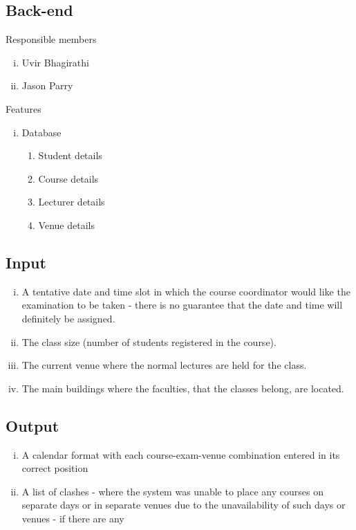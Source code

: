 \documentclass{article}
\begin{document}
\subsection{Back-end}

Responsible members
\begin{enumerate}[i., nosep]
	\item Uvir Bhagirathi
	\item Jason Parry
\end{enumerate}

Features
\begin{enumerate}[i., nosep]

	\item Database
		\begin{enumerate}[-, nosep]
			\item Student details
			\item Course details
			\item Lecturer details
			\item Venue details
		\end{enumerate}
	
\end{enumerate}

\subsection{Input}

\begin{enumerate}[i., leftmargin=*]
	\item A tentative  date  and  time  slot  in  which  the course coordinator would like  the  examination  to  be  taken - there is no guarantee that the date and time will definitely be assigned.
	\item The class size (number of students registered in the course).
	\item The current venue where the normal lectures are held for the class.
	\item The main buildings where the faculties, that the classes belong, are located.
\end{enumerate}

\subsection{Output}

\begin{enumerate}[i., leftmargin=*]
	\item A calendar format with each course-exam-venue combination entered in its correct position 
	\item A list of clashes - where the system was unable to place any courses on separate days or in separate venues due to the unavailability of such days or venues - if there are any
\end{enumerate}
\end{document}
